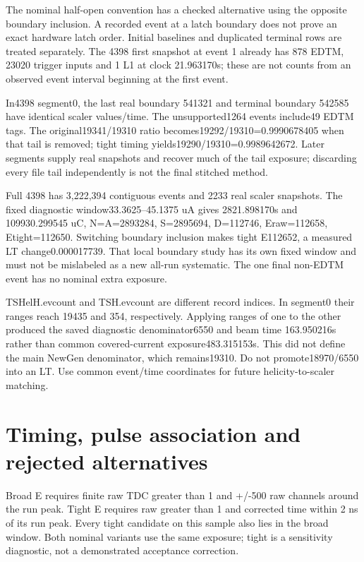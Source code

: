 The nominal half-open convention has a checked alternative using the opposite boundary inclusion. A recorded event at a latch boundary does not prove an exact hardware latch order. Initial baselines and duplicated terminal rows are treated separately. The 4398 first snapshot at event 1 already has 878 EDTM, 23020 trigger inputs and 1 L1 at clock 21.963170s; these are not counts from an observed event interval beginning at the first event.


In4398 segment0, the last real boundary 541321 and terminal boundary 542585 have identical scaler values/time. The unsupported1264 events include49 EDTM tags. The original19341/19310 ratio becomes19292/19310=0.9990678405 when that tail is removed; tight timing yields19290/19310=0.9989642672. Later segments supply real snapshots and recover much of the tail exposure; discarding every file tail independently is not the final stitched method.


Full 4398 has 3,222,394 contiguous events and 2233 real scaler snapshots. The fixed diagnostic window33.3625--45.1375 uA gives 2821.898170s and 109930.299545 uC, N=A=2893284, S=2895694, D=112746, Eraw=112658, Etight=112650. Switching boundary inclusion makes tight E112652, a measured LT change0.000017739. That local boundary study has its own fixed window and must not be mislabeled as a new all-run systematic. The one final non-EDTM event has no nominal extra exposure.


TSHelH.evcount and TSH.evcount are different record indices. In segment0 their ranges reach 19435 and 354, respectively. Applying ranges of one to the other produced the saved diagnostic denominator6550 and beam time 163.950216s rather than common covered-current exposure483.315153s. This did not define the main NewGen denominator, which remains19310. Do not promote18970/6550 into an LT. Use common event/time coordinates for future helicity-to-scaler matching.


\section{Timing, pulse association and rejected alternatives}
Broad E requires finite raw TDC greater than 1 and +/-500 raw channels around the run peak. Tight E requires raw greater than 1 and corrected time within 2 ns of its run peak. Every tight candidate on this sample also lies in the broad window. Both nominal variants use the same exposure; tight is a sensitivity diagnostic, not a demonstrated acceptance correction.


